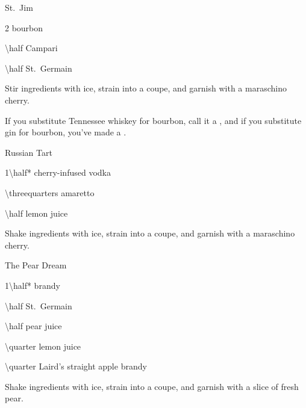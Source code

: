\begin{Cocktail*}{St.\ Jim}
	\begin{Ingredients}
	\item \SI{2}{\oz} bourbon
	\item \SI{\half}{\oz} Campari %
	\item \SI{\half}{\oz} St.\ Germain
	\end{Ingredients}
	
	\begin{Instructions}
	Stir ingredients with ice, strain into a coupe, and garnish with a maraschino cherry.
	
	If you substitute Tennessee whiskey for bourbon, call it a , and if you substitute gin for bourbon, you've made a \InlineCocktail{St.~George}.
	\end{Instructions}
\end{Cocktail*}

\begin{Cocktail*}{Russian Tart}
	\begin{Ingredients}
	\item \SI{1\half*}{\oz} cherry-infused vodka %
	\item \SI{\threequarters}{\oz} amaretto
	\item \SI{\half}{\oz} lemon juice
	\end{Ingredients}
	
	\begin{Instructions}
	Shake ingredients with ice, strain into a coupe, and garnish with a maraschino cherry.
	\end{Instructions}
\end{Cocktail*}

\begin{Cocktail*}{The Pear Dream} %
	\begin{Ingredients}
	\item \SI{1\half*}{\oz} brandy%
	\item \SI{\half}{\oz} St.\ Germain
	\item \SI{\half}{\oz} pear juice
	\item \SI{\quarter}{\oz} lemon juice
	\item \SI{\quarter}{\oz} Laird's straight apple brandy
	\end{Ingredients}
	
	\begin{Instructions}
	Shake ingredients with ice, strain into a coupe, and garnish with a slice of fresh pear.
	\end{Instructions}
\end{Cocktail*}

